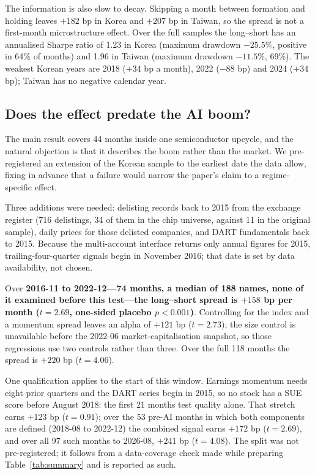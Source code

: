 \documentclass[12pt,a4paper]{article}
\begin{document}
The information is also slow to decay. Skipping a month between formation and holding leaves $+182$ bp in Korea and
$+207$ bp in Taiwan, so the spread is not a first-month microstructure effect. Over the full samples the long--short
has an annualised Sharpe ratio of 1.23 in Korea (maximum drawdown $-25.5\%$, positive in 64\% of months) and 1.96 in
Taiwan (maximum drawdown $-11.5\%$, 69\%). The weakest Korean years are 2018 ($+34$ bp a month), 2022 ($-88$ bp) and
2024 ($+34$ bp); Taiwan has no negative calendar year.

\subsection{Does the effect predate the AI boom?}\label{sec:preai}

The main result covers 44 months inside one semiconductor upcycle, and the natural objection is that it describes the
boom rather than the market. We pre-registered an extension of the Korean sample to the earliest date the data allow,
fixing in advance that a failure would narrow the paper's claim to a regime-specific effect.

Three additions were needed: delisting records back to 2015 from the exchange register (716 delistings, 34 of them in
the chip universe, against 11 in the original sample), daily prices for those delisted companies, and DART fundamentals
back to 2015. Because the multi-account interface returns only annual figures for 2015, trailing-four-quarter signals
begin in November 2016; that date is set by data availability, not chosen.

Over \textbf{2016-11 to 2022-12---74 months, a median of 188 names, none of it examined before this test---the
long--short spread is $+158$ bp per month ($t=2.69$, one-sided placebo $p<0.001$)}. Controlling for the index and a
momentum spread leaves an alpha of $+121$ bp ($t=2.73$); the size control is unavailable before the 2022-06
market-capitalisation snapshot, so those regressions use two controls rather than three. Over the full 118 months the
spread is $+220$ bp ($t=4.06$).

One qualification applies to the start of this window. Earnings momentum needs eight prior quarters and the DART
series begin in 2015, so no stock has a SUE score before August 2018: the first 21 months test quality alone. That
stretch earns $+123$ bp ($t=0.91$); over the 53 pre-AI months in which both components are defined (2018-08 to
2022-12) the combined signal earns $+172$ bp ($t=2.69$), and over all 97 such months to 2026-08, $+241$ bp
($t=4.08$). The split was not pre-registered; it follows from a data-coverage check made while preparing
Table~\ref{tab:summary} and is reported as such.
\end{document}

